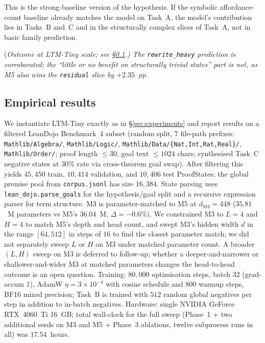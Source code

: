 \documentclass[11pt]{article}
\theoremstyle{definition}
\theoremstyle{plain}
\begin{document}
This is the strong-baseline version of the hypothesis. If the symbolic affordance-count baseline already matches the model on Task~A, the model's contribution lies in Tasks~B and~C and in the structurally complex slices of Task~A, not in basic family prediction.

\medskip
\noindent (\emph{Outcome at LTM-Tiny scale; see \S\ref{subsec:results}.) The \texttt{rewrite\_heavy} prediction is corroborated; the ``little or no benefit on structurally trivial states'' part is not, as M5 also wins the \texttt{residual} slice by $+2.35$~pp.}

\subsection{Empirical results}\label{subsec:results}

We instantiate LTM-Tiny exactly as in \S\ref{sec:experiments} and report results
on a filtered LeanDojo Benchmark~4 subset (random split, $7$ file-path
prefixes: \texttt{Mathlib/Algebra/}, \texttt{Mathlib/Logic/},
\texttt{Mathlib/Data/\{Nat,Int,Rat,Real\}/}, \texttt{Mathlib/Order/}; proof
length $\le 30$, goal text $\le 1024$ chars; synthesised Task~C negative
states at $30\%$ rate via cross-theorem goal swap). After filtering this
yields $45{,}450$ train, $10{,}414$ validation, and $10{,}406$ test
ProofStates; the global premise pool from \texttt{corpus.jsonl} has size
$16{,}384$. State parsing uses \texttt{lean\_dojo.parse\_goals} for the
hypothesis/goal split and a recursive expression parser for term structure.
M3 is parameter-matched to M5 at $d_{\mathrm{M3}} = 448$ ($35.81$~M
parameters vs M5's $36.04$~M, $\Delta = -0.6\%$). We constrained M3 to
$L = 4$ and $H = 4$ to match M5's depth and head count, and swept M3's
hidden width $d$ in the range $[64, 512]$ in steps of $16$ to find the
closest parameter match; we did not separately sweep $L$ or $H$ on M3
under matched parameter count. A broader $(L, H)$ sweep on M3 is deferred
to follow-up; whether a deeper-and-narrower or shallower-and-wider M3 at
matched parameters changes the head-to-head outcome is an open question. Training: $80{,}000$
optimisation steps, batch $32$ (grad-accum $1$), AdamW
$\eta = 3 \times 10^{-4}$ with cosine schedule and $800$ warmup steps, BF16
mixed precision; Task~B is trained with $512$ random global negatives per
step in addition to in-batch negatives. Hardware: single NVIDIA GeForce
RTX~4060~Ti 16~GB; total wall-clock for the full sweep (Phase~1 + two
additional seeds on M3 and M5 + Phase~3 ablations, twelve subprocess runs
in all) was $17.54$~hours.
\end{document}
